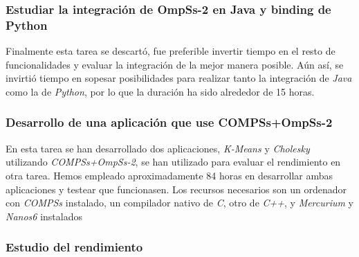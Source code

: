 \subsubsection{Estudiar la integración de OmpSs-2 en Java y binding de Python}

\begin{comment}
En caso de que la primera integración haya funcionado, se estudiará la posibilidad de hacer lo mismo con \textit{Java} y el \textit{binding} de \textit{Python}. Consistirá exactamente de los mismos pasos, y puede ayudar a mejorar la implementación anterior. La duración estimada de esta tarea dependerá de si se decide realizar o no esta actividad. Mínimo se emplearán 15 horas en el estudio preliminar, y en caso de realizar la integración, 78 horas más, es decir, 15 horas o bien 93 horas. Pese a que la tarea es muy similar a la anterior, el tiempo previsto es algo menor por el hecho de que ya se ha podido realizar una integración y la implementación debería ser parecida. Los recursos necesarios son un ordenador con \textit{COMPSs} instalado, un compilador nativo de \textit{C}, otro de \textit{C++}, y \textit{Mercurium} y \textit{Nanos6} instalados.
\end{comment}

Finalmente esta tarea se descartó, fue preferible invertir tiempo en el resto de funcionalidades y evaluar la integración de la mejor manera posible. Aún así, se invirtió tiempo en sopesar posibilidades para realizar tanto la integración de \textit{Java} como la de \textit{Python}, por lo que la duración ha sido alrededor de 15 horas.

\subsubsection{Desarrollo de una aplicación que use COMPSs+OmpSs-2}

En esta tarea se han desarrollado dos aplicaciones, \textit{K-Means} y \textit{Cholesky} utilizando \textit{COMPSs+OmpSs-2}, se han utilizado para evaluar el rendimiento en otra tarea. Hemos empleado aproximadamente 84 horas en desarrollar ambas aplicaciones y testear que funcionasen. Los recursos necesarios son un ordenador con \textit{COMPSs} instalado, un compilador nativo de \textit{C}, otro de \textit{C++}, y \textit{Mercurium} y \textit{Nanos6} instalados

\subsubsection{Estudio del rendimiento}

